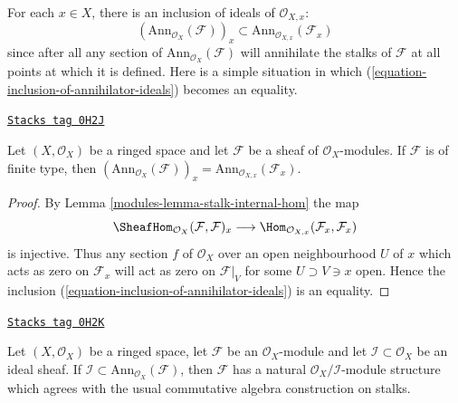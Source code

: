 For each $x\in X$, there is an inclusion of ideals of $\mathcal{O}_{X, x}$:
\begin{equation}
\label{equation-inclusion-of-annihilator-ideals}
(\text{Ann}_{\mathcal{O}_X}(\mathcal{F}))_x
\subset
\text{Ann}_{\mathcal{O}_{X, x}}(\mathcal{F}_x)
\end{equation}
since after all any section of $\text{Ann}_{\mathcal{O}_X}(\mathcal{F})$
will annihilate the stalks of $\mathcal{F}$ at all points at which it is
defined. Here is a simple situation in which
(\ref{equation-inclusion-of-annihilator-ideals}) becomes an equality.

\begin{lemma}
\label{modules-lemma-finite-type-annihilator-stalk}
\href{https://stacks.math.columbia.edu/tag/0H2J}{\texttt{Stacks tag 0H2J}}

Let $(X, \mathcal{O}_X)$ be a ringed space and let
$\mathcal{F}$ be a sheaf of $\mathcal{O}_X$-modules.
If $\mathcal{F}$ is of finite type, then
$(\text{Ann}_{\mathcal{O}_X}(\mathcal{F}))_x =
\text{Ann}_{\mathcal{O}_{X, x}}(\mathcal{F}_x)$.
\end{lemma}

\begin{proof}

By Lemma \ref{modules-lemma-stalk-internal-hom} the map
$$
\SheafHom_{\mathcal{O}_X}(\mathcal{F}, \mathcal{F})_x \longrightarrow
\Hom_{\mathcal{O}_{X,x}}(\mathcal{F}_x, \mathcal{F}_x)
$$
is injective. Thus any section $f$ of $\mathcal{O}_X$ over an open
neighbourhood $U$ of $x$ which acts as zero on $\mathcal{F}_x$
will act as zero on $\mathcal{F}|_V$ for some $U \supset V \ni x$ open.
Hence the inclusion (\ref{equation-inclusion-of-annihilator-ideals})
is an equality.
\end{proof}

\begin{lemma}
\label{modules-lemma-induced-quotient-ring-sheaf-module-structure}
\href{https://stacks.math.columbia.edu/tag/0H2K}{\texttt{Stacks tag 0H2K}}

Let $(X, \mathcal{O}_X)$ be a ringed space, let $\mathcal{F}$ be an
$\mathcal{O}_X$-module and let $\mathcal{I} \subset \mathcal{O}_X$
be an ideal sheaf. If
$\mathcal{I} \subset \text{Ann}_{\mathcal{O}_X}(\mathcal{F})$,
then $\mathcal{F}$ has a natural $\mathcal{O}_X/\mathcal{I}$-module structure
which agrees with the usual commutative algebra construction on stalks.
\end{lemma}

